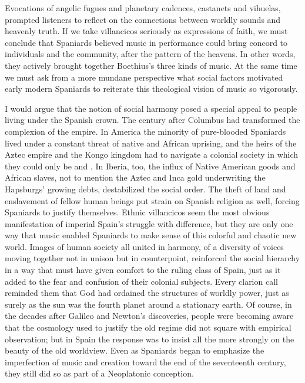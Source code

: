 
Evocations of angelic fugues and planetary cadences, castanets and vihuelas,
prompted listeners to reflect on the connections between worldly sounds and
heavenly truth.
If we take villancicos seriously as expressions of faith, we must conclude that
Spaniards believed music in performance could bring concord to individuals and
the community, after the pattern of the heavens.
In other words, they actively brought together Boethius's three kinds of music.
At the same time we must ask from a more mundane perspective what social
factors motivated early modern Spaniards to reiterate this theological vision
of music so vigorously.


I would argue that the notion of social harmony posed a special appeal to
people living under the Spanish crown.
The century after Columbus had transformed the complexion of the empire.
In America the minority of pure-blooded Spaniards lived under a constant threat
of native and African uprising, and the heirs of the Aztec empire and the Kongo
kingdom had to navigate a colonial society in which they could only be
 and .
In Iberia, too, the influx of Native American goods and African slaves, not to
mention the Aztec and Inca gold underwriting the Hapsburgs' growing debts,
destabilized the social order.
The theft of land and enslavement of fellow human beings put strain on Spanish
religion as well, forcing Spaniards to justify themselves.
Ethnic villancicos seem the most obvious manifestation of imperial Spain's
struggle with difference, but they are only one way that music enabled
Spaniards to make sense of this colorful and chaotic new world.
Images of human society all united in harmony, of a diversity of voices moving
together not in unison but in counterpoint, reinforced the social hierarchy in
a way that must have given comfort to the ruling class of Spain, just as it
added to the fear and confusion of their colonial subjects.%
    \Autocites
    {Baker:Harmony}
    {Irving:Colonial}
    {Illari:Polychoral}
Every clarion call reminded them that God had ordained the structures of
worldly power, just as surely as the sun was the fourth planet around a
stationary earth.
Of course, in the decades after Galileo and Newton's discoveries, people were
becoming aware that the cosmology used to justify the old regime did not square
with empirical observation; but in Spain the response was to insist all the
more strongly on the beauty of the old worldview.
Even as Spaniards began to emphasize the imperfection of music and creation
toward the end of the seventeenth century, they still did so as part of a 
Neoplatonic conception.


